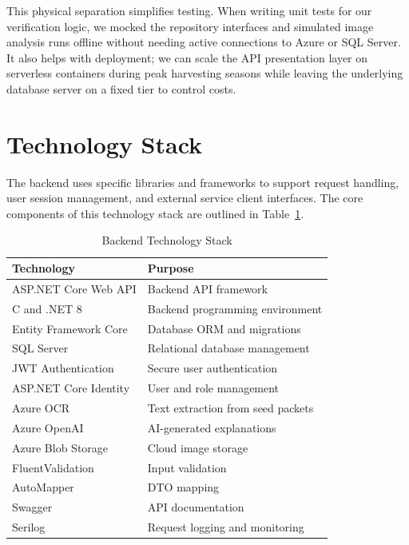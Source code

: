 This physical separation simplifies testing. When writing unit tests for our verification logic, we mocked the repository interfaces and simulated image analysis runs offline without needing active connections to Azure or SQL Server. It also helps with deployment; we can scale the API presentation layer on serverless containers during peak harvesting seasons while leaving the underlying database server on a fixed tier to control costs.

\section{Technology Stack}
\label{sec:backend-tech-stack}

The backend uses specific libraries and frameworks to support request handling, user session management, and external service client interfaces. The core components of this technology stack are outlined in Table~\ref{tab:backend-tech-stack}.

\begin{table}[htbp]
\centering
\caption{Backend Technology Stack}
\label{tab:backend-tech-stack}
\small
\renewcommand{\arraystretch}{1.1}

\begin{tabularx}{\textwidth}{|p{5.2cm}|X|}
\hline
\textbf{Technology} & \textbf{Purpose} \\
\hline
ASP.NET Core Web API & Backend API framework \\
\hline
C\char35{} and .NET 8 & Backend programming environment \\
\hline
Entity Framework Core & Database ORM and migrations \\
\hline
SQL Server & Relational database management \\
\hline
JWT Authentication & Secure user authentication \\
\hline
ASP.NET Core Identity & User and role management \\
\hline
Azure OCR & Text extraction from seed packets \\
\hline
Azure OpenAI & AI-generated explanations \\
\hline
Azure Blob Storage & Cloud image storage \\
\hline
FluentValidation & Input validation \\
\hline
AutoMapper & DTO mapping \\
\hline
Swagger & API documentation \\
\hline
Serilog & Request logging and monitoring \\
\hline
\end{tabularx}
\end{table}

